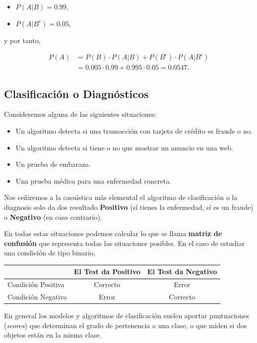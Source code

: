 \documentclass[]{book}
\providecommand{\tightlist}{%
  \setlength{\itemsep}{0pt}\setlength{\parskip}{0pt}}
\begin{document}
\begin{itemize}
\tightlist
\item
  \(P(A|B)=0.99\),
\item
  \(P(A|B^c)= 0.05\),
\end{itemize}

y por tanto,

\[
\begin{array}{rl}
P(A) & =P(B)\cdot P(A|B)+P(B^c)\cdot P(A|B^c)\\ &
=0.005\cdot 0.99+0.995\cdot 0.05=0.0547.\end{array}
\]

\hypertarget{clasificaciuxf3n-o-diagnuxf3sticos}{%
\subsection{Clasificación o Diagnósticos}\label{clasificaciuxf3n-o-diagnuxf3sticos}}

Consideremos alguna de las siguientes situaciones:

\begin{itemize}
\tightlist
\item
  Un algoritmo detecta si una transacción con tarjeta de crédito es fraude o no.
\item
  Un algoritmo detecta si tiene o no que mostrar un anuncio en una web.
\item
  Un prueba de embarazo.
\item
  Una prueba médica para una enfermedad concreta.
\end{itemize}

Nos ceñiremos a la casuística más elemental el algoritmo de clasificación o la diagnosis solo da dos resultado \textbf{Positivo} (sí tienes la enfermedad, sí es un fraude) o \textbf{Negativo} (en caso contrario).

En todas estas situaciones podemos calcular lo que se llama \textbf{matriz de confusión} que representa todas las situaciones posibles. En el caso de estudiar una condición de tipo binario,

\begin{longtable}[]{@{}lcc@{}}
\toprule
& El Test da Positivo & El Test da Negativo\tabularnewline
\midrule
\endhead
Condición Positiva & Correcto & Error\tabularnewline
Condición Negativa & Error & Correcto\tabularnewline
\bottomrule
\end{longtable}

En general los modelos y algoritmos de clasificación suelen aportar puntuaciones (\emph{scores}) que determinan el grado de pertenencia a una clase, o que miden si dos objetos están en la misma clase.
\end{document}

